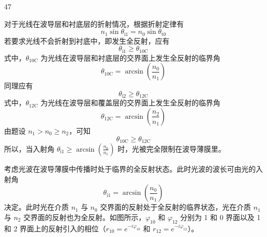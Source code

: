 \begin{solution}{47}
    \begin{subsolution}
        对于光线在波导层和衬底层的折射情况，根据折射定律有
        \begin{equation}
            n_{1}\sin\theta_{\mathrm{i}1} = n_{0}\sin\theta_{\mathrm{t}0}
            \label{eq:1.s47}
        \end{equation}
        若要求光线不会折射到衬底中，即发生全反射，应有
        \begin{equation}
            \theta_{\mathrm{i}1} \geq \theta_{10\mathrm{C}}
            \label{eq:2.s47}
        \end{equation}
        式中，$\theta_{10\mathrm{C}}$ 为光线在波导层和衬底层的交界面上发生全反射的临界角
        \begin{equation}
            \theta_{10\mathrm{C}} = \arcsin\left(\frac{n_{0}}{n_{1}}\right)
            \label{eq:3.s47}
        \end{equation}
        同理应有
        \begin{equation}
            \theta_{\mathrm{i}2} \geq \theta_{12\mathrm{C}}
            \label{eq:4.s47}
        \end{equation}
        式中，$\theta_{12\mathrm{C}}$ 为光线在波导层和覆盖层的交界面上发生全反射的临界角
        \begin{equation}
            \theta_{12\mathrm{C}} = \arcsin\left(\frac{n_{2}}{n_{1}}\right)
            \label{eq:5.s47}
        \end{equation}
        由题设 $n_{1} > n_{0} \geq n_{2}$，可知
        \begin{equation}
            \theta_{10\mathrm{C}} \geq \theta_{12\mathrm{C}}
            \label{eq:6.s47}
        \end{equation}
        所以，当入射角 $\theta_{\mathrm{i}1} \geq \arcsin\left(\frac{n_{0}}{n_{1}}\right)$ 时，光被完全限制在波导薄膜里。
    \end{subsolution}
    \begin{subsolution}
        考虑光波在波导薄膜中传播时处于临界的全反射状态。此时光波的波长可由光的入射角
        \begin{equation*}
            \theta_{\mathrm{i}1} = \arcsin\left(\frac{n_{0}}{n_{1}}\right)
        \end{equation*}
        决定。此时光在介质 $n_{1}$ 与 $n_{0}$ 交界面的反射处于全反射的临界状态，光在介质 $n_{1}$ 与 $n_{2}$ 交界面的反射也为全反射。如图所示，$\varphi_{10}$ 和 $\varphi_{12}$ 分别为 1 和 0 界面以及 1 和 2 界面上的反射引入的相位（$r_{10} = e^{-i\varphi_{10}}$ 和 $r_{12} = e^{-i\varphi_{12}}$）。


\end{subsolution}
\end{solution}
